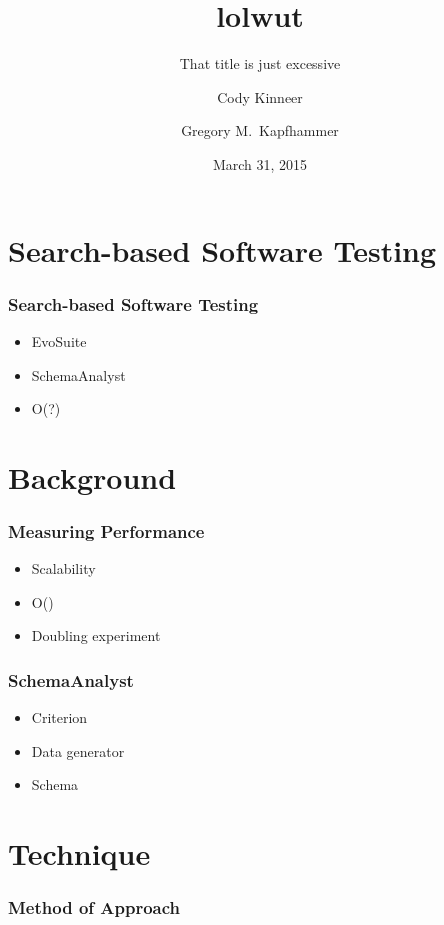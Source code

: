 \documentclass[hyperref]{beamer}
\title{lolwut}
\subtitle{That title is just excessive}
\author[Kinneer-Kapfhammer]{Cody Kinneer \and Gregory M.\ Kapfhammer}
\institute[Allegheny College]{Department of Computer Science\\ Allegheny College}
\date[Feb 23, 2015]{March 31, 2015}
\begin{document}
\begin{frame}
  \titlepage
\end{frame}



\section{Search-based Software Testing}
  \begin{frame}
    \frametitle{Search-based Software Testing}
    \begin{itemize}
      \item EvoSuite
      \item SchemaAnalyst
      \item \in O(?)
    \end{itemize}
  \end{frame}

  \section{Background}

    \begin{frame}
      \frametitle{Measuring Performance}
      \begin{itemize}
        \item Scalability
        \item O()
        \item Doubling experiment
      \end{itemize}
    \end{frame}

    \begin{frame}
      \frametitle{SchemaAnalyst}
      \begin{itemize}
        \item Criterion
        \item Data generator
        \item Schema
      \end{itemize}
    \end{frame}

    \section{Technique}
      \begin{frame}
          \frametitle{Method of Approach}
          \centering
          
          
      \end{frame}
\end{document}
